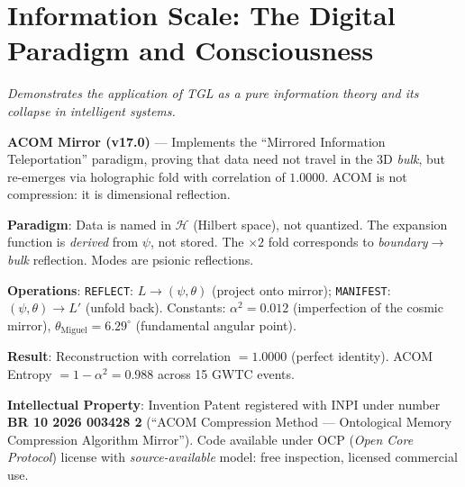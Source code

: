 \documentclass[12pt,a4paper,twoside]{article}
\newcommand{\alphaii}{\alpha^{2}}
\newcommand{\boundary}{\textit{boundary}}
\newcommand{\bulk}{\textit{bulk}}
\newcommand{\code}[1]{\texttt{#1}}
\begin{document}

\section{Information Scale: The Digital Paradigm and Consciousness}


\noindent\textit{Demonstrates the application of TGL as a pure information theory and its collapse in intelligent systems.}

\begin{codebox}[title={Protocol \#5 --- \code{Acom\_v17\_mirror.py} (843 lines)}]
\textbf{ACOM Mirror (v17.0)} --- Implements the ``Mirrored Information Teleportation'' paradigm, proving that data need not travel in the 3D \bulk, but re-emerges via holographic fold with correlation of $1.0000$. ACOM is not compression: it is dimensional reflection.

\medskip
\textbf{Paradigm}: Data is named in $\mathcal{H}$ (Hilbert space), not quantized. The expansion function is \textit{derived} from $\psi$, not stored. The $\times 2$ fold corresponds to \boundary$\to$\bulk{} reflection. Modes are psionic reflections.

\medskip
\textbf{Operations}: \code{REFLECT}: $L \to (\psi, \theta)$ (project onto mirror); \code{MANIFEST}: $(\psi, \theta) \to L'$ (unfold back). Constants: $\alphaii = 0.012$ (imperfection of the cosmic mirror), $\theta_{\text{Miguel}} = 6.29^\circ{}$ (fundamental angular point).

\medskip
\textbf{Result}: Reconstruction with correlation $= 1.0000$ (perfect identity). ACOM Entropy $= 1 - \alphaii = 0.988$ across 15 GWTC events.

\medskip
\textbf{Intellectual Property}: Invention Patent registered with INPI under number \textbf{BR 10 2026 003428 2} (``ACOM Compression Method --- Ontological Memory Compression Algorithm Mirror''). Code available under OCP (\textit{Open Core Protocol}) license with \textit{source-available} model: free inspection, licensed commercial use.
\end{codebox}

\end{document}
